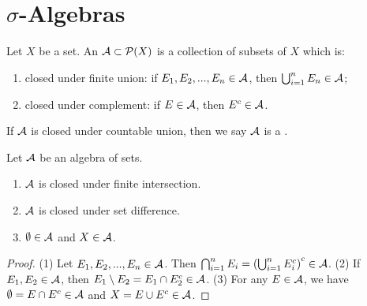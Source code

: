 \section{$\sigma$-Algebras}
    \begin{definition}
        Let $X$ be a set. An  $\mathcal{A} \subset \mathcal{P}(X)$ is a collection of subsets of $X$ which is:
            \begin{enumerate}[label = (\arabic*),itemsep=1pt,topsep=3pt]
                \item closed under finite union: if $E_1,E_2,...,E_n \in \mathcal{A}$, then $\bigcup_{i = 1}^n E_n \in \mathcal{A}$;
                \item closed under complement: if $E \in \mathcal{A}$, then $E^c \in \mathcal{A}$.
            \end{enumerate}
        If $\mathcal{A}$ is closed under countable union, then we say $\mathcal{A}$ is a .
    \end{definition}

    \begin{proposition}\label{prop:propoerties-of-sigma-algebras}
        Let $\mathcal{A}$ be an algebra of sets.
        \begin{enumerate}[label = (\arabic*),itemsep=1pt,topsep=3pt]
            \item $\mathcal{A}$ is closed under finite intersection.
            \item $\mathcal{A}$ is closed under set difference.
            \item $\emptyset \in \mathcal{A}$ and $X \in \mathcal{A}$.
        \end{enumerate}
    \end{proposition}
        \begin{proof}
            (1) Let $E_1,E_2,...,E_n \in \mathcal{A}$. Then $\bigcap_{i = 1}^n E_i = \left( \bigcup_{i=1}^n E_i^c \right)^c \in \mathcal{A}$. (2) If $E_1,E_2 \in \mathcal{A}$, then $E_1 \setminus E_2 = E_1 \cap E_2^c \in \mathcal{A}$. (3) For any $E \in \mathcal{A}$, we have $\emptyset = E \cap E^c \in \mathcal{A}$ and $X = E \cup E^c \in \mathcal{A}$.
        \end{proof}


